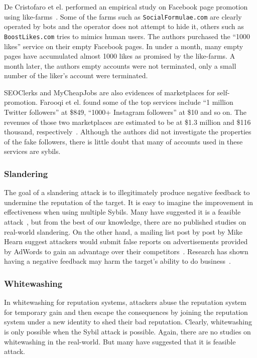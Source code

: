 De Cristofaro et el. performed an empirical study on Facebook page promotion
using like-farms~\cite{de2014paying}. Some of the farms such as
\verb!SocialFormulae.com! are clearly operated by bots and the operator does not
attempt to hide it, others such as \verb!BoostLikes.com! tries to mimics human
users. The authors purchased the ``1000 likes'' service on their empty Facebook
pages. In under a month, many empty pages have accumulated almost 1000 likes as
promised by the like-farms. A month later, the authors empty accounts were not
terminated, only a small number of the liker's account were terminated.


SEOClerks and MyCheapJobs are also evidences of marketplaces for self-promotion.
Farooqi et el. found some of the top services include ``1 million Twitter
followers'' at \$849, ``1000+ Instagram followers'' at \$10 and so on. The
revenues of those two marketplaces are estimated to be at \$1.3 million and
\$116 thousand, respectively~\cite{farooqi2015characterizing}. Although the
authors did not investigate the properties of the fake followers, there is
little doubt that many of accounts used in these services are sybils.

\subsubsection{Slandering}
The goal of a slandering attack is to illegitimately produce negative feedback
to undermine the reputation of the target. It is easy to imagine the improvement
in effectiveness when using multiple Sybils. Many have suggested it is a
feasible attack~\cite{hoffman2009survey, koutrouli2012taxonomy}, but from the
best of our knowledge, there are no published studies on real-world slandering.
On the other hand, a mailing list post by post by Mike Hearn suggest attackers
would submit false reports on advertisements provided by AdWords to gain an
advantage over their competitors~\cite{adwords}. Research has shown having a
negative feedback may harm the target's ability to do
business~\cite{ba2002evidence}.

\subsubsection{Whitewashing}
In whitewashing for reputation systems, attackers abuse the reputation system
for temporary gain and then escape the consequences by joining the reputation
system under a new identity to shed their bad reputation. Clearly, whitewashing
is only possible when the Sybil attack is possible. Again, there are no studies
on whitewashing in the real-world. But many have suggested that it is feasible
attack\cite{hoffman2009survey, marti2006taxonomy}.

